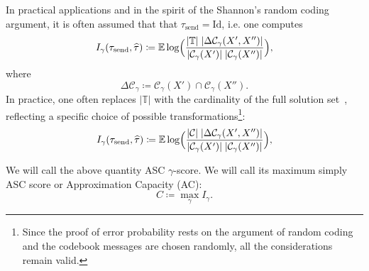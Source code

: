 In practical applications and in the spirit of the Shannon's random coding
argument, it is often assumed that that $\tau_\text{send} = \mathrm{Id}$, i.e.
one computes
\begin{equation}
  I_\gamma(\tau_\text{send}, \hat \tau) \coloneqq  \Expct \log 
  \Bigl(
    \frac{|\mathbb{T}| \; |\Delta \mathcal{C}_\gamma(X', X'')|}%
      {|\mathcal{C}_\gamma(X')| \; |\mathcal{C}_\gamma(X'')|}
  \Bigr),
\end{equation}
where
\begin{equation}
  \Delta \mathcal{C}_\gamma \coloneqq \mathcal{C}_\gamma(X') 
      \cap \mathcal{C}_\gamma(X'').
\end{equation}
%
In practice, one often replaces $|\mathbb{T}|$ with the cardinality of the full
solution set~\citep{morteza12}, reflecting a specific choice of possible
transformations\footnote{Since the proof of error probability rests on the
argument of random coding and the codebook messages are chosen randomly, all
the considerations remain valid.}:
\begin{equation}\label{eq:asc_mutual_information_formula}
  I_\gamma(\tau_\text{send}, \hat \tau) \coloneqq  \Expct \log 
  \Bigl(
    \frac{|\C| \; |\Delta \mathcal{C}_\gamma(X', X'')|}%
      {|\mathcal{C}_\gamma(X')| \; |\mathcal{C}_\gamma(X'')|}
  \Bigr),
\end{equation}
%
\begin{definition}
\label{def:asc_score}
  We will call the above quantity ASC $\gamma$-score. We will call its maximum
  simply ASC score or Approximation Capacity (AC):
  \begin{equation}
    C \coloneqq \max_\gamma I_\gamma.
  \end{equation}
\end{definition}


